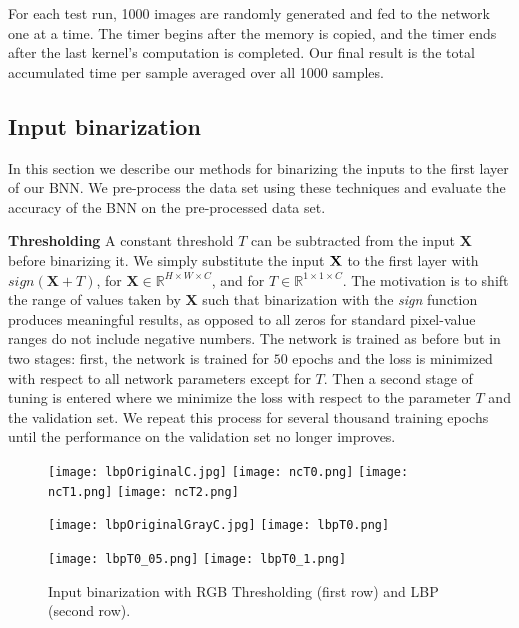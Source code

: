 \documentclass[conference,compsoc]{IEEEtran}
\begin{document}
For each test run, 1000 images are randomly generated and fed to the network one at a time. The timer begins after the memory is copied, and the timer ends after the last kernel's computation is completed. Our final result is the total accumulated time per sample averaged over all 1000 samples.



\subsection{Input binarization}
In this section we describe our methods for binarizing the inputs to the first layer of our BNN. We pre-process the data set using these techniques and evaluate the accuracy of the BNN on the pre-processed data set.

\textbf{Thresholding}
A constant threshold $T$ can be subtracted from the input $\mathbf{X}$ before binarizing it. We simply substitute the input $\bf{X}$ to the first layer with $sign(\mathbf{X} + T)$, for $\mathbf{X}\in \mathbb{R}^{H\times W\times C}$, and for $T \in \mathbb{R}^{1\times 1\times C}$. The motivation is to shift the range of values taken by $\mathbf{X}$ such that binarization with the \textit{sign} function produces meaningful results, as opposed to all zeros for standard pixel-value ranges do not include negative numbers. The network is trained as before but in two stages: first, the network is trained for $50$ epochs and the loss is minimized with respect to all network parameters except for $T$. Then a second stage of tuning is entered where we minimize the loss with respect to the parameter $T$ and the validation set. We repeat this process for several thousand training epochs until the performance on the validation set no longer improves.


\begin{figure}[h]
{
  
  
  }
  
  {
{\texttt{[image: lbpOriginalC.jpg]}}
	\texttt{[image: ncT0.png]}
  {\texttt{[image: ncT1.png]}}
  {\texttt{[image: ncT2.png]}}
  
  \texttt{[image: lbpOriginalGrayC.jpg]}
  	\texttt{[image: lbpT0.png]}}
  {\texttt{[image: lbpT0\_05.png]}}
  {\texttt{[image: lbpT0\_1.png]}}
 
  
  
  
  
  
  \caption{Input binarization with RGB Thresholding (first row) and LBP (second row).}
\end{figure}
  \label{fig:binarizedInputs}
  
\end{document}

